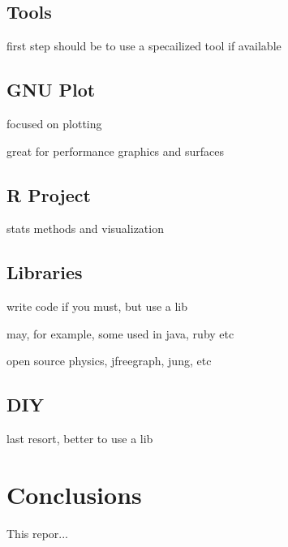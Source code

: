 \documentclass[a4paper, 11pt]{article}
\begin{document}
\subsection{Tools}
first step should be to use a specailized tool if available

\subsection{GNU Plot}
focused on plotting

great for performance graphics and surfaces

\subsection{R Project}
stats methods and visualization


\subsection{Libraries}
write code if you must, but use a lib

may, for example, some used in java, ruby etc

open source physics, jfreegraph, jung, etc


\subsection{DIY}
last resort, better to use a lib


%
%
\section{Conclusions}
\label{sec:conclusions}
This repor...





\end{document}
